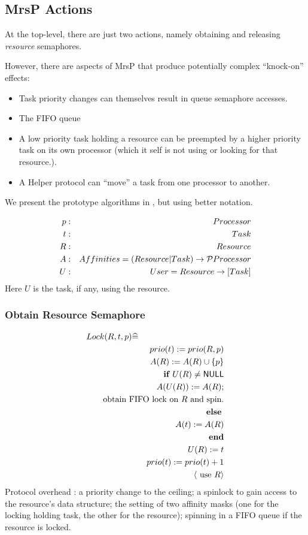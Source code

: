 \subsection{MrsP Actions}

At the top-level, there are just two actions,
namely obtaining and releasing \emph{resource} semaphores.


However,
there are aspects of MrsP that produce potentially complex
``knock-on'' effects:
\begin{itemize}
  \item
    Task priority changes can themselves result in queue semaphore accesses.
  \item
    The FIFO queue
  \item
    A low priority task holding a resource
    can be preempted by a higher priority task on its own processor
    (which it self is not using or looking for that resource.).
  \item
    A Helper protocol can ``move'' a task from one processor to another.
\end{itemize}

We present the prototype algorithms in \cite{Burns:2013:MrsP},
but using better notation.

\begin{eqnarray*}
   p &:& Processor
\\ t &:& Task
\\ R &:& Resource
\\ A &:& Affinities =  {(Resource|Task)} \rightarrow {\mathcal{P}Processor}
\\ U &:& User = {Resource} \rightarrow {[Task]}
\end{eqnarray*}
Here $U$ is the task, if any, using the resource.

\subsubsection{Obtain Resource Semaphore}

\begin{eqnarray*}
   \lefteqn{Lock(R,t,p) \defs {}}
\\ && prio(t) := prio(R,p)
\\ && A(R) := A(R) \cup \setof p
\\ && \IF U(R) \neq \NULL
\\ && \quad A(U(R)) := A(R);
\\ && \quad \textrm{obtain FIFO lock on }R\textrm{ and spin.}
\\ && \!\ELSE
\\ && \quad A(t) := A(R)
\\ && \END
\\ && U(R) := t
\\ && prio(t) := prio(t)+1
\\ && \langle \textrm{ use } R \rangle
\end{eqnarray*}
Protocol overhead \cite{Burns:2013:MrsP}:
a priority change to the ceiling;
a spinlock to gain access to the resource’s data structure;
the setting of two affinity masks
(one for the locking holding task, the other for the resource);
spinning in a FIFO queue if the resource is locked.

